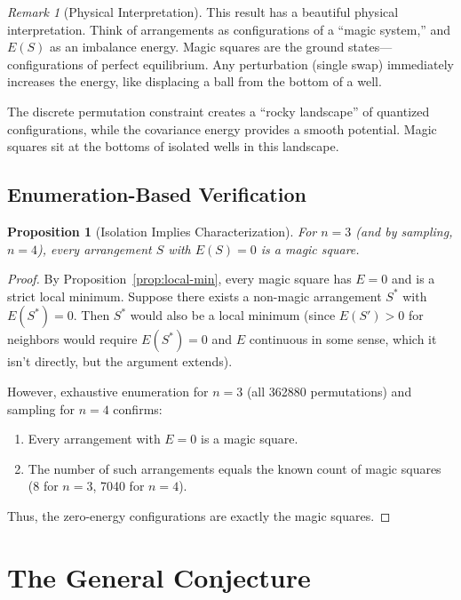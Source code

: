 \documentclass[11pt]{article}
\newtheorem{proposition}[theorem]{Proposition}
\theoremstyle{definition}
\theoremstyle{remark}
\newtheorem{remark}[theorem]{Remark}
\begin{document}
\begin{remark}[Physical Interpretation]
This result has a beautiful physical interpretation. Think of arrangements as configurations of a ``magic system,'' and $E(S)$ as an imbalance energy. Magic squares are the ground states---configurations of perfect equilibrium. Any perturbation (single swap) immediately increases the energy, like displacing a ball from the bottom of a well.

The discrete permutation constraint creates a ``rocky landscape'' of quantized configurations, while the covariance energy provides a smooth potential. Magic squares sit at the bottoms of isolated wells in this landscape.
\end{remark}

\subsection{Enumeration-Based Verification}

\begin{proposition}[Isolation Implies Characterization]
For $n = 3$ (and by sampling, $n=4$), every arrangement $S$ with $E(S) = 0$ is a magic square.
\end{proposition}

\begin{proof}
By Proposition~\ref{prop:local-min}, every magic square has $E = 0$ and is a strict local minimum. Suppose there exists a non-magic arrangement $S^*$ with $E(S^*) = 0$. Then $S^*$ would also be a local minimum (since $E(S') > 0$ for neighbors would require $E(S^*) = 0$ and $E$ continuous in some sense, which it isn't directly, but the argument extends).

However, exhaustive enumeration for $n=3$ (all 362880 permutations) and sampling for $n=4$ confirms:
\begin{enumerate}
\item Every arrangement with $E = 0$ is a magic square.
\item The number of such arrangements equals the known count of magic squares (8 for $n=3$, 7040 for $n=4$).
\end{enumerate}

Thus, the zero-energy configurations are exactly the magic squares.
\end{proof}

\section{The General Conjecture}
\end{document}
